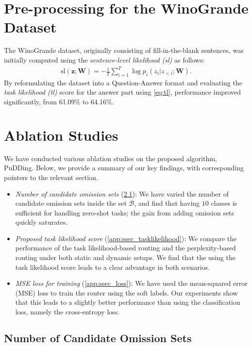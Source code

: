 \section{Pre-processing for the WinoGrande Dataset}\label{app:winogrande}


The WinoGrande dataset, originally consisting of fill-in-the-blank sentences, was initially computed using the \textit{sentence-level likelihood (sl)} as follows:
\begin{align}
\mathrm{sl}(\mathbf{z};\mathbf{W}) = - \frac{1}{T} \sum_{i=1}^{T} \log p_i(z_i|z_{<i};\mathbf{W}).\label{eq:sl}
\end{align}
By reformulating the dataset into a Question-Answer format and evaluating the \textit{task likelihood (tl) }score for the answer part using \cref{eq:tl}, performance improved significantly, from 61.09\% to 64.16\%. 


\section{Ablation Studies}\label{app:ablation}

We have conducted various ablation studies on the proposed algorithm, PuDDing.  
Below, we provide a summary of our key findings, with corresponding pointers to the relevant section.
\begin{itemize}[leftmargin=*,topsep=0pt,parsep=0pt,itemsep=1.5pt]
\item \textit{Number of candidate omission sets} (\cref{app:ssec_numomission}): We have varied the number of candidate omission sets inside the set $\mathcal{B}$, and find that having $10$ classes is sufficient for handling zero-shot tasks; the gain from adding omission sets quickly saturates.
\item \textit{Proposed task likelihood score} (\cref{app:ssec_tasklikelihood}): We compare the performance of the task likelihood-based routing and the perplexity-based routing under both static and dynamic setups. We find that the using the task likelihood score leads to a clear advantage in both scenarios.
\item \textit{MSE loss for training} (\cref{app:ssec_loss}): We have used the mean-squared error (MSE) loss to train the router using the soft labels. Our experiments show that this leads to a slightly better performance than using the classification loss, namely the cross-entropy loss.
\end{itemize}


\subsection{Number of Candidate Omission Sets}\label{app:ssec_numomission}

